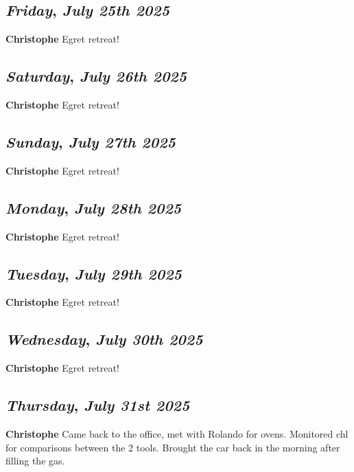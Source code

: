\def\day{\textit{July 25th 2025}}
\def\weekday{\textit{Friday}}
\subsection*{\weekday, \day}
\textbf {Christophe}
Egret retreat!
\def\day{\textit{July 26th 2025}}
\def\weekday{\textit{Saturday}}
\subsection*{\weekday, \day}
\textbf {Christophe}
Egret retreat!
\def\day{\textit{July 27th 2025}}
\def\weekday{\textit{Sunday}}
\subsection*{\weekday, \day}
\textbf {Christophe}
Egret retreat!
\def\day{\textit{July 28th 2025}}
\def\weekday{\textit{Monday}}
\subsection*{\weekday, \day}
\textbf {Christophe}
Egret retreat!
\def\day{\textit{July 29th 2025}}
\def\weekday{\textit{Tuesday}}
\subsection*{\weekday, \day}
\textbf {Christophe}
Egret retreat!
\def\day{\textit{July 30th 2025}}
\def\weekday{\textit{Wednesday}}
\subsection*{\weekday, \day}
\textbf {Christophe}
Egret retreat!
\def\day{\textit{July 31st 2025}}
\def\weekday{\textit{Thursday}}
\subsection*{\weekday, \day}
\textbf {Christophe}
Came back to the office, met with Rolando for ovens. Monitored chl for comparisons between the 2 tools. Brought the car back in the morning after filling the gas. 